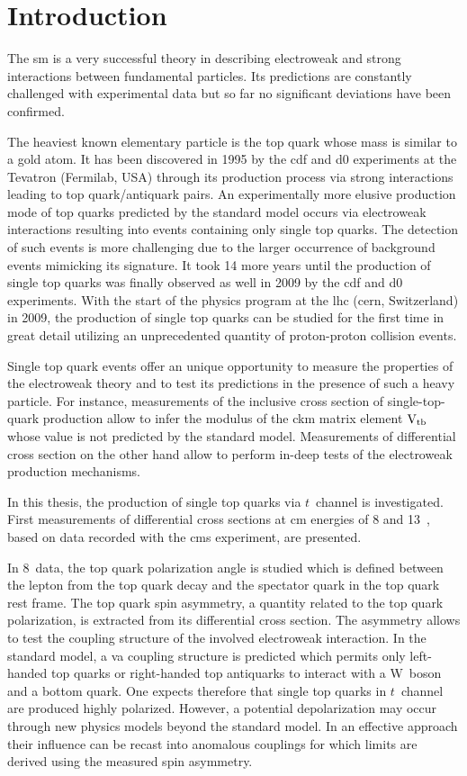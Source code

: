 \chapter*{Introduction}

The \acrlong{sm} is a very successful theory in describing electroweak and strong interactions between fundamental particles. Its predictions are constantly challenged with experimental data but so far no significant deviations have been confirmed. 

The heaviest known elementary particle is the top quark whose mass is similar to a gold atom. It has been discovered in 1995 by the \gls{cdf} and \gls{d0} experiments at the Tevatron (Fermilab, USA) through its production process via strong interactions leading to top quark/antiquark pairs. An experimentally more elusive production mode of top quarks predicted by the standard model occurs via electroweak interactions resulting into events containing only single top quarks. The detection of such events is more challenging due to the larger occurrence of background events mimicking its signature. It took 14 more years until the production of single top quarks was finally observed as well in 2009 by the \gls{cdf} and \gls{d0} experiments. With the start of the physics program at the \gls{lhc} (\gls{cern}, Switzerland) in 2009, the production of single top quarks can be studied for the first time in great detail utilizing an unprecedented quantity of proton-proton collision events.

Single top quark events offer an unique opportunity to measure the properties of the electroweak theory and to test its predictions in the presence of such a heavy particle. For instance, measurements of the inclusive cross section of single-top-quark production allow to infer the modulus of the \gls{ckm} matrix element ${\textrm{V}_\textrm{tb}}$ whose value is not predicted by the standard model. Measurements of differential cross section on the other hand allow to perform in-deep tests of the electroweak production mechanisms.

In this thesis, the production of single top quarks via $t$~channel is investigated.  First measurements of differential cross sections at \acrlong{cm} energies of 8 and 13~\TeV, based on data recorded with the \gls{cms} experiment, are presented. 

In 8~\TeV data, the top quark polarization angle is studied which is defined between the lepton from the top quark decay and the spectator quark in the top quark rest frame. The top quark spin asymmetry, a quantity related to the top quark polarization, is extracted from its differential cross section. The asymmetry allows to test the coupling structure of the involved electroweak interaction. In the standard model, a \gls{va} coupling structure is predicted which permits only left-handed top quarks or right-handed top antiquarks to interact with a W~boson and a bottom quark. One expects therefore that single top quarks in $t$~channel are produced highly polarized. However, a potential depolarization may occur through new physics models beyond the standard model. In an effective approach their influence can be recast into anomalous couplings for which limits are derived using the measured spin asymmetry.

